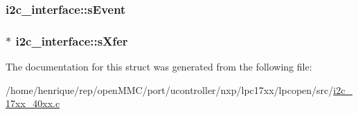 \hypertarget{structi2c__interface_aa0820cc1e59b1da898435b4813f5c58d}{
\subsubsection[{s\-Event}]{ i2c\-\_\-interface\-::s\-Event}}\label{structi2c__interface_aa0820cc1e59b1da898435b4813f5c58d}
\hypertarget{structi2c__interface_a891a1ea53436714c117aaa2d0917e9f2}{
\subsubsection[{s\-Xfer}]{$\ast$ i2c\-\_\-interface\-::s\-Xfer}}\label{structi2c__interface_a891a1ea53436714c117aaa2d0917e9f2}


The documentation for this struct was generated from the following file\-:\begin{DoxyCompactItemize}
\item 
/home/henrique/rep/open\-M\-M\-C/port/ucontroller/nxp/lpc17xx/lpcopen/src/\hyperlink{i2c__17xx__40xx_8c}{i2c\-\_\-17xx\-\_\-40xx.\-c}\end{DoxyCompactItemize}
